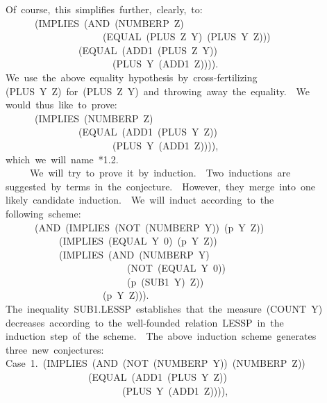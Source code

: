 \documentclass[11pt]{book}
\newenvironment{pubasis}{\begin{flushleft}\ttfamily\small}{\normalsize\rmfamily\end{flushleft}}
\begin{document}
\begin{pubasis}
~~Of~course,~this~simplifies~further,~clearly,~to:\\

~~~~~~~~(IMPLIES~(AND~(NUMBERP~Z)\\
~~~~~~~~~~~~~~~~~~~~~~(EQUAL~(PLUS~Z~Y)~(PLUS~Y~Z)))\\
~~~~~~~~~~~~~~~~~(EQUAL~(ADD1~(PLUS~Z~Y))\\
~~~~~~~~~~~~~~~~~~~~~~~~(PLUS~Y~(ADD1~Z)))).\\

~~We~use~the~above~equality~hypothesis~by~cross-fertilizing\\
~~(PLUS~Y~Z)~for~(PLUS~Z~Y)~and~throwing~away~the~equality.~~We\\
~~would~thus~like~to~prove:\\

~~~~~~~~(IMPLIES~(NUMBERP~Z)\\
~~~~~~~~~~~~~~~~~(EQUAL~(ADD1~(PLUS~Y~Z))\\
~~~~~~~~~~~~~~~~~~~~~~~~(PLUS~Y~(ADD1~Z)))),\\

~~which~we~will~name~*1.2.\\

~~~~~~~We~will~try~to~prove~it~by~induction.~~Two~inductions~are\\
~~suggested~by~terms~in~the~conjecture.~~However,~they~merge~into~one\\
~~likely~candidate~induction.~~We~will~induct~according~to~the\\
~~following~scheme:\\
~~~~~~~~(AND~(IMPLIES~(NOT~(NUMBERP~Y))~(p~Y~Z))\\
~~~~~~~~~~~~~(IMPLIES~(EQUAL~Y~0)~(p~Y~Z))\\
~~~~~~~~~~~~~(IMPLIES~(AND~(NUMBERP~Y)\\
~~~~~~~~~~~~~~~~~~~~~~~~~~~(NOT~(EQUAL~Y~0))\\
~~~~~~~~~~~~~~~~~~~~~~~~~~~(p~(SUB1~Y)~Z))\\
~~~~~~~~~~~~~~~~~~~~~~(p~Y~Z))).\\
~~The~inequality~SUB1.LESSP~establishes~that~the~measure~(COUNT~Y)\\
~~decreases~according~to~the~well-founded~relation~LESSP~in~the\\
~~induction~step~of~the~scheme.~~The~above~induction~scheme~generates\\
~~three~new~conjectures:\\

~~Case~1.~(IMPLIES~(AND~(NOT~(NUMBERP~Y))~(NUMBERP~Z))\\
~~~~~~~~~~~~~~~~~~~(EQUAL~(ADD1~(PLUS~Y~Z))\\
~~~~~~~~~~~~~~~~~~~~~~~~~~(PLUS~Y~(ADD1~Z)))),\\


\end{pubasis}
\end{document}
